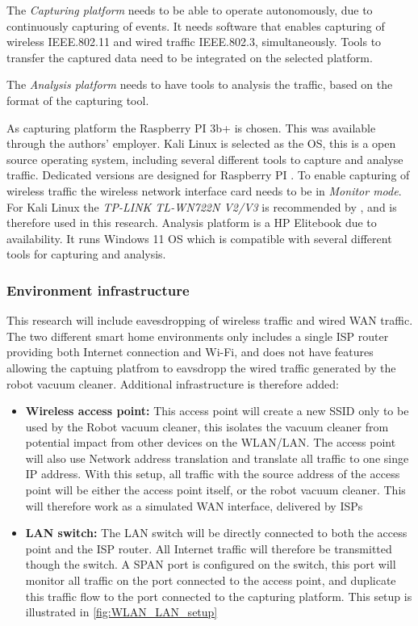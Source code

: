  The \textit{Capturing platform} needs to be able to operate autonomously, due to continuously capturing of events. It needs software that enables capturing of wireless IEEE.802.11 and wired traffic IEEE.802.3, simultaneously. Tools to transfer the captured data need to be integrated on the selected platform. 
 
 The \textit{Analysis platform} needs to have tools to analysis the traffic, based on the format of the capturing tool. 


As capturing platform the Raspberry PI 3b+ is chosen. This was available through the authors' employer. Kali Linux is selected as the OS, this is a open source operating system, including several different tools to capture and analyse traffic. Dedicated versions are designed for Raspberry PI \cite{kalidownload}. To enable capturing of wireless traffic the wireless network interface card needs to be in \textit{Monitor mode}. For Kali Linux the \textit{TP-LINK TL-WN722N V2/V3} is recommended by \cite{Kali_monitormode_guide}, and is therefore used in this research. 
Analysis platform is a HP Elitebook due to availability. It runs Windows 11 OS which is compatible with several different tools for capturing and analysis.

\subsubsection{Environment infrastructure}
This research will include eavesdropping of wireless traffic and wired WAN traffic. The two different smart home environments only includes a single ISP router providing both Internet connection and Wi-Fi, and does not have features allowing the captuing platfrom to eavsdropp the wired traffic generated by the robot vacuum cleaner. Additional infrastructure is therefore added: 
\begin{itemize}
    \item \textbf{Wireless access point:} This access point will create a new SSID only to be used by the Robot vacuum cleaner, this isolates the vacuum cleaner from potential impact from other devices on the WLAN/LAN. The access point will also use Network address translation and translate all traffic to one singe IP address. With this setup, all traffic with the source address of the access point will be either the access point itself, or the robot vacuum cleaner. This will therefore work as a simulated WAN interface, delivered by ISPs
    \item \textbf{LAN switch:} The LAN switch will be directly connected to both the access point and the ISP router. All Internet traffic will therefore be transmitted though the switch. A SPAN port is configured on the switch, this port will monitor all traffic on the port connected to the access point, and duplicate this traffic flow to the port connected to the capturing platform. This setup is illustrated in \ref{fig:WLAN_LAN_setup}
\end{itemize}

